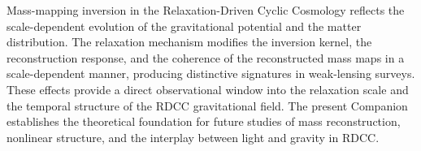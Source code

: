 \documentclass[11pt,a4paper]{article}
\begin{document}
Mass-mapping inversion in the Relaxation-Driven Cyclic Cosmology reflects the 
scale-dependent evolution of the gravitational potential and the matter 
distribution. The relaxation mechanism modifies the inversion kernel, the 
reconstruction response, and the coherence of the reconstructed mass maps in a 
scale-dependent manner, producing distinctive signatures in weak-lensing surveys. 
These effects provide a direct observational window into the relaxation scale and 
the temporal structure of the RDCC gravitational field. The present Companion 
establishes the theoretical foundation for future studies of mass reconstruction, 
nonlinear structure, and the interplay between light and gravity in RDCC.


\nocite{*}

\end{document}
